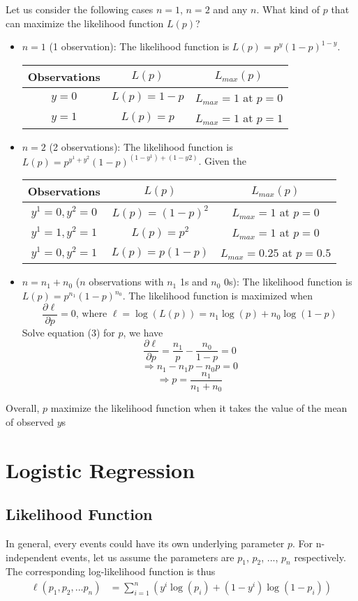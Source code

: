\documentclass[12pt, oneside]{article}
\begin{document}
Let us consider the following cases $n=1$, $n=2$ and any $n$. What kind of $p$ that can maximize the likelihood function $L(p)$?
\begin{itemize}
\item $n=1$ (1 observation): The likelihood function is $L(p)=p^{y}(1-p)^{1-y}$. 
\begin{center}
\begin{tabular}{c|c|c} 
Observations & $L(p)$ &$ L_{max}(p)$\\
\hline
$y=0$ & $L(p)=1-p$ &$L_{max}=1$ at $p=0$\\
$y=1$ & $L(p)=p$     &$L_{max}=1$ at $p=1$\\
\end{tabular}
\end{center}
\item $n=2$ (2 observations): The likelihood function is $L(p)=p^{y^1+y^2}(1-p)^{(1-y^1)+(1-y2)}$. Given the 
\begin{center}
\begin{tabular}{c|c|c} 
Observations & $L(p)$ &$ L_{max}(p)$\\
\hline
$y^1=0, y^2=0$ & $L(p)=(1-p)^2$ &$L_{max}=1$ at $p=0$\\
$y^1=1, y^2=1$ & $L(p)=p^2$     &$L_{max}=1$ at $p=0$\\
$y^1=0, y^2=1$ & $L(p)=p(1-p)$  &$L_{max}=0.25$ at $p=0.5$
\end{tabular}
\end{center}
\item $n=n_1+n_0$ ($n$ observations with $n_1$ 1s and $n_0$ 0s): The likelihood function is $L(p)=p^{n_1}(1-p)^{n_0}$. The likelihood function is maximized when 
\begin{equation}
\frac{\partial \ell}{\partial p}=0 \text{, where }\ell=\log(L(p))=n_1 \log(p)+n_0 \log(1-p)
\end{equation}
Solve equation (3) for $p$, we have 
$$\frac{\partial \ell}{\partial p}=\frac{n_1}{p}-\frac{n_0}{1-p}=0$$
$$\Rightarrow n_1-n_1 p-n_0 p=0$$
$$\Rightarrow p=\frac{n_1}{n_1+n_0}$$
\end{itemize}

Overall, $p$ maximize the likelihood function when it takes the value of the mean of observed $y$s

\section{Logistic Regression}
\subsection{Likelihood Function}
In general, every events could have its own underlying parameter $p$. For n-independent events, let us assume the parameters are $p_1$, $p_2$, ..., $p_n$ respectively. The corresponding log-likelihood function is thus
\begin{align}
\ell(p_1, p_2,...p_n)&=\sum\limits_{i=1}^{n}\left(y^i \log(p_i)+(1-y^i)\log(1-p_i)\right)
\end{align}
\end{document}
